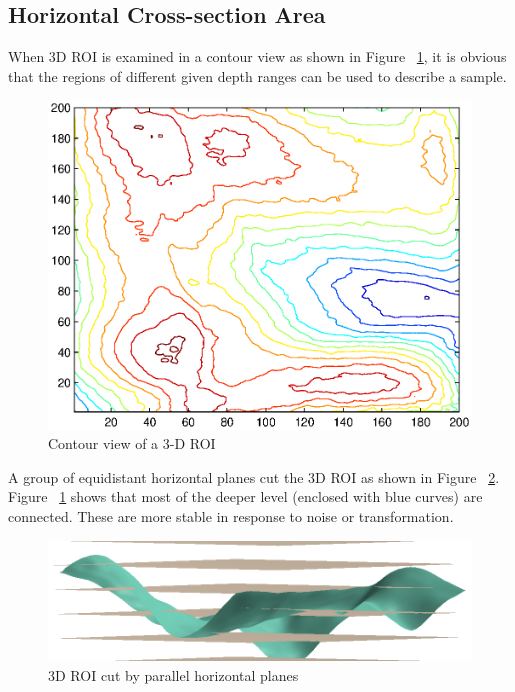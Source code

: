 \subsection{Horizontal Cross-section Area}
\label{ssec:methodology:hca}

When 3D ROI is examined in a contour view as shown in Figure ~\ref{fig:methodology:roicontour}, it is obvious that the regions of different given depth ranges can be used to describe a sample.

\begin{figure}[htb]
\begin{center}
\includegraphics[width=0.9\linewidth]{ch-methodology/figures/roicontour}
\caption[Contour view of a 3-D ROI]{Contour view of a 3-D ROI}
\label{fig:methodology:roicontour}
\end{center}
\end{figure}

A group of equidistant horizontal planes cut the 3D ROI as shown in Figure ~\ref{fig:methodology:planecut}. Figure ~\ref{fig:methodology:roicontour} shows that most of the deeper level (enclosed with blue curves) are connected. These are more stable in response to noise or transformation.

\begin{figure}[htb]
\begin{center}
\includegraphics[width=0.9\linewidth]{ch-methodology/figures/planecut}
\caption[3D ROI cut by parallel horizontal planes]{3D ROI cut by parallel horizontal planes}
\label{fig:methodology:planecut}
\end{center}
\end{figure}


